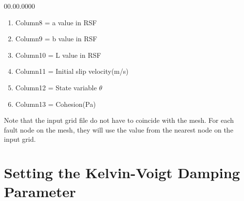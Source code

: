 \begin{lyxlist}{00.00.0000}
\begin{enumerate}
  \item{Column8} = a value in RSF

  \item{Column9} = b value in RSF

  \item{Column10} = L value in RSF

  \item{Column11} = Initial slip velocity(m/s)

  \item{Column12} = State variable $\theta$

  \item{Column13} = Cohesion(Pa)
  \end{enumerate}
  Note that the input grid file do not have to coincide with the mesh. For each fault node on the mesh, they will use the value from the nearest node on the input grid.
\end{lyxlist}


\section{Setting the Kelvin-Voigt Damping Parameter}\label{sec:Setting-the-Kelvin-Voigt}

